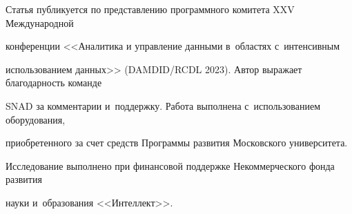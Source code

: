 {\renewcommand{\thefootnote}{\fnsymbol{footnote}} \footnotetext[1]

{Статья публикуется по представлению программного комитета XXV Международной 

конференции <<Аналитика и управление данными в~областях с~интенсивным 

использованием данных>> (DAMDID\!/\!RCDL 2023). Автор выражает благодарность команде 

SNAD за комментарии и~поддержку. Работа выполнена с~использованием оборудования, 

приобретенного за счет средств Программы развития Московского университета. 

Исследование выполнено при финансовой поддержке Некоммерческого фонда развития 

науки и~образования <<Интеллект>>.}}







